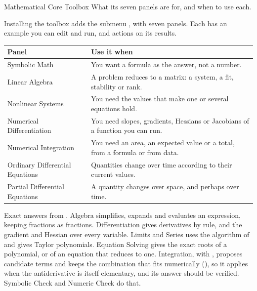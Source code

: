 
\renewcommand{\vignetteauthor}{Pollis}
\renewcommand{\vignettedate}{1 November 2026}
\renewcommand{\vignettelicense}{AGPL-3.0}



  {Mathematical Core Toolbox}
  {What its seven panels are for, and when to use each.}

Installing the toolbox adds the submenu , with seven panels. Each has an example you can edit and run, and actions on its results.

\medskip
{\small
\begin{tabularx}{\linewidth}{@{}>{\raggedright\arraybackslash}p{62mm}X@{}}
\toprule
\textbf{Panel} & \textbf{Use it when} \\\midrule
Symbolic Math & You want a formula as the answer, not a number. \\
Linear Algebra & A problem reduces to a matrix: a system, a fit, stability or rank. \\
Nonlinear Systems & You need the values that make one or several equations hold. \\
Numerical Differentiation & You need slopes, gradients, Hessians or Jacobians of a function you can run. \\
Numerical Integration & You need an area, an expected value or a total, from a formula or from data. \\
Ordinary Differential Equations & Quantities change over time according to their current values. \\
Partial Differential Equations & A quantity changes over space, and perhaps over time. \\\bottomrule
\end{tabularx}}


Exact answers from . Algebra simplifies, expands and evaluates an expression, keeping fractions as fractions. Differentiation gives derivatives by rule, and the gradient and Hessian over every variable. Limits and Series uses the algorithm of  and gives Taylor polynomials. Equation Solving gives the exact roots of a polynomial, or of an equation that reduces to one. Integration, with , proposes candidate terms and keeps the combination that fits numerically (), so it applies when the antiderivative is itself elementary, and its answer should be verified. Symbolic Check and Numeric Check do that.

